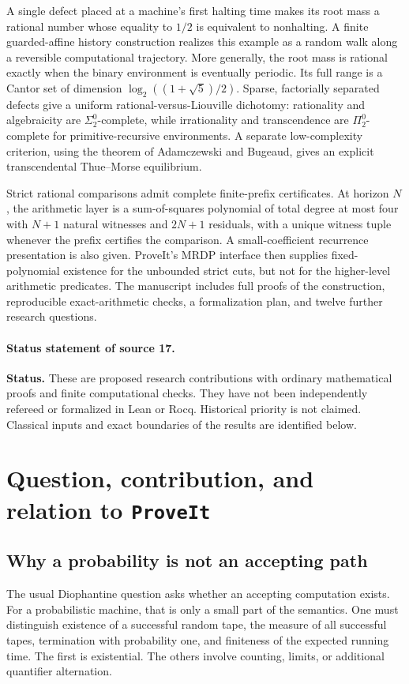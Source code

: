 \documentclass[11pt,letterpaper]{article}
\numberwithin{equation}{section}
\theoremstyle{definition}
\theoremstyle{remark}
\newcommand{\srcmark}[1]{\par\noindent{\small\itshape [source~#1]}\par}
\newcommand{\reponame}{\texttt{ProveIt}}
\begin{document}
A single defect placed at a machine's first halting time makes its root
mass a rational number whose equality to $1/2$ is equivalent to nonhalting.
A finite guarded-affine history construction realizes this example as a
random walk along a reversible computational trajectory. More generally,
the root mass is rational exactly when the binary environment is eventually
periodic. Its full range is a Cantor set of dimension
$\log_2((1+\sqrt5)/2)$. Sparse, factorially separated defects give a uniform
rational-versus-Liouville dichotomy: rationality and algebraicity are
$\Sigma^0_2$-complete, while irrationality and transcendence are
$\Pi^0_2$-complete for primitive-recursive environments. A separate
low-complexity criterion, using the theorem of Adamczewski and Bugeaud,
gives an explicit transcendental Thue--Morse equilibrium.

Strict rational comparisons admit complete finite-prefix certificates.
At horizon $N$, the arithmetic layer is a sum-of-squares polynomial of
total degree at most four with $N+1$ natural witnesses and $2N+1$
residuals, with a unique witness tuple whenever the prefix certifies the
comparison. A small-coefficient recurrence presentation is also given. ProveIt's MRDP interface then supplies fixed-polynomial
existence for the unbounded strict cuts, but not for the higher-level
arithmetic predicates. The manuscript includes full proofs of the
construction, reproducible exact-arithmetic checks, a formalization plan,
and twelve further research questions.
\paragraph{Status statement of source 17.}
\noindent\textbf{Status.} These are proposed research contributions with ordinary
mathematical proofs and finite computational checks. They have not been
independently refereed or formalized in Lean or Rocq. Historical priority
is not claimed. Classical inputs and exact boundaries of the results are
identified below.

\section{Question, contribution, and relation to \reponame}\label{pqc:ql:sec:intro}
\srcmark{13}

\subsection{Why a probability is not an accepting path}
The usual Diophantine question asks whether an accepting computation exists.
For a probabilistic machine, that is only a small part of the semantics. One
must distinguish existence of a successful random tape, the measure of all
successful tapes, termination with probability one, and finiteness of the
expected running time. The first is existential. The others involve counting,
limits, or additional quantifier alternation.
\end{document}
